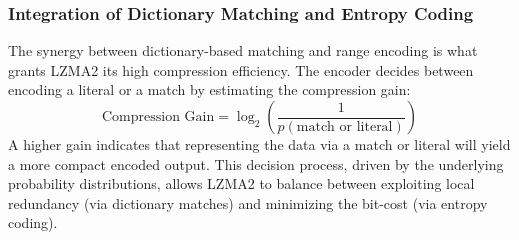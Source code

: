\subsubsection{Integration of Dictionary Matching and Entropy Coding}
The synergy between dictionary-based matching and range encoding is what grants LZMA2 its high compression efficiency. The encoder decides between encoding a literal or a match by estimating the compression gain:
\begin{equation}
    \text{Compression Gain} = \log_2\left(\frac{1}{p(\text{match or literal})}\right)
\end{equation}
A higher gain indicates that representing the data via a match or literal will yield a more compact encoded output. This decision process, driven by the underlying probability distributions, allows LZMA2 to balance between exploiting local redundancy (via dictionary matches) and minimizing the bit-cost (via entropy coding).

\pagebreak
